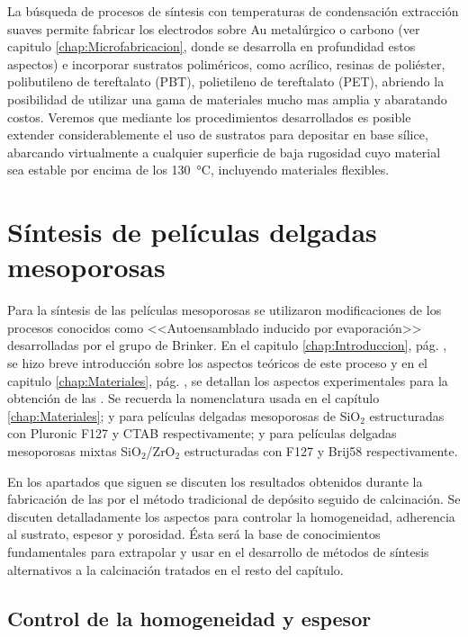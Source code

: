 	La búsqueda de procesos de síntesis con temperaturas de condensación extracción suaves permite fabricar los electrodos sobre Au metalúrgico o carbono (ver capitulo \ref{chap:Microfabricacion}, donde se desarrolla en profundidad estos aspectos) e incorporar sustratos poliméricos, como acrílico, resinas de poliéster, polibutileno de tereftalato (PBT), polietileno de tereftalato (PET), abriendo la posibilidad de utilizar una gama de materiales mucho mas amplia y abaratando costos. Veremos que mediante los procedimientos desarrollados es posible extender considerablemente el uso de sustratos para depositar \pdm\space en base sílice, abarcando virtualmente a cualquier superficie de baja rugosidad cuyo material sea estable por encima de los \SI{130}{\celsius}, incluyendo materiales flexibles.
	
\section{Síntesis de películas delgadas mesoporosas}
		
		Para la síntesis de las películas mesoporosas se utilizaron modificaciones de los procesos conocidos como <<Autoensamblado inducido por evaporación>> desarrolladas por el grupo de Brinker.\cite{Brinker1999} En el capitulo \ref{chap:Introduccion}, pág. \pageref{sec:mesoporosos}, se hizo breve introducción sobre los aspectos teóricos de este proceso y en el capitulo \ref{chap:Materiales}, pág. \pageref{sec:sintesis_mesoporosos}, se detallan los aspectos experimentales para la obtención de las \pdm. Se recuerda la nomenclatura usada en el capítulo \ref{chap:Materiales}; \pdmF\space y \pdmC\space para películas delgadas mesoporosas de SiO$_2$ estructuradas con Pluronic F127 y CTAB respectivamente; \pdmZ\space y \pdmZB\space para películas delgadas mesoporosas mixtas SiO$_2$/ZrO$_2$ estructuradas con F127 y Brij58 respectivamente.

		En los apartados que siguen se discuten los resultados obtenidos durante la fabricación de las \pdm\space por el método tradicional de depósito seguido de calcinación. Se discuten detalladamente los aspectos para controlar la homogeneidad, adherencia al sustrato, espesor y porosidad. Ésta será la base de conocimientos fundamentales para extrapolar y usar en el desarrollo de métodos de síntesis alternativos a la calcinación tratados en el resto del capítulo.

	\subsection{Control de la homogeneidad y espesor}
		
